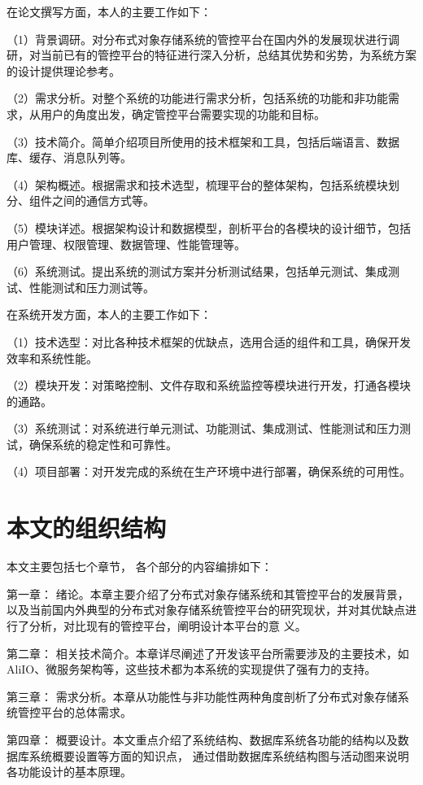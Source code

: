 在论文撰写方面，本人的主要工作如下：

（1）背景调研。对分布式对象存储系统的管控平台在国内外的发展现状进行调研，对当前已有的管控平台的特征进行深入分析，总结其优势和劣势，为系统方案的设计提供理论参考。

（2）需求分析。对整个系统的功能进行需求分析，包括系统的功能和非功能需求，从用户的角度出发，确定管控平台需要实现的功能和目标。

（3）技术简介。简单介绍项目所使用的技术框架和工具，包括后端语言、数据库、缓存、消息队列等。

（4）架构概述。根据需求和技术选型，梳理平台的整体架构，包括系统模块划分、组件之间的通信方式等。

（5）模块详述。根据架构设计和数据模型，剖析平台的各模块的设计细节，包括用户管理、权限管理、数据管理、性能管理等。

（6）系统测试。提出系统的测试方案并分析测试结果，包括单元测试、集成测试、性能测试和压力测试等。

在系统开发方面，本人的主要工作如下：

（1）技术选型：对比各种技术框架的优缺点，选用合适的组件和工具，确保开发效率和系统性能。

（2）模块开发：对策略控制、文件存取和系统监控等模块进行开发，打通各模块的通路。

（3）系统测试：对系统进行单元测试、功能测试、集成测试、性能测试和压力测试，确保系统的稳定性和可靠性。

（4）项目部署：对开发完成的系统在生产环境中进行部署，确保系统的可用性。

\section{本文的组织结构}

本文主要包括七个章节， 各个部分的内容编排如下： 

第一章： 绪论。本章主要介绍了分布式对象存储系统和其管控平台的发展背景，以及当前国内外典型的分布式对象存储系统管控平台的研究现状，并对其优缺点进行了分析，对比现有的管控平台，阐明设计本平台的意
义。

第二章： 相关技术简介。本章详尽阐述了开发该平台所需要涉及的主要技术，如AliIO、微服务架构等，这些技术都为本系统的实现提供了强有力的支持。

第三章： 需求分析。本章从功能性与非功能性两种角度剖析了分布式对象存储系统管控平台的总体需求。

第四章： 概要设计。本文重点介绍了系统结构、数据库系统各功能的结构以及数据库系统概要设置等方面的知识点， 通过借助数据库系统结构图与活动图来说明各功能设计的基本原理。

